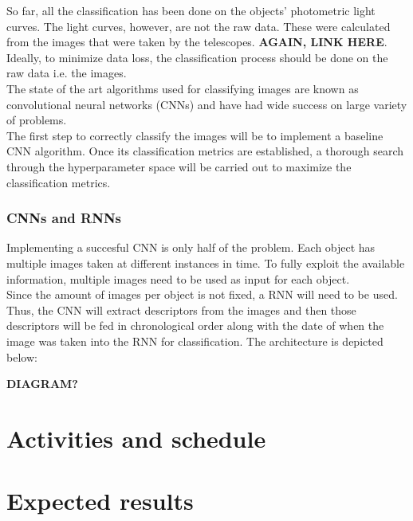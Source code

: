 So far, all the classification has been done on the objects' photometric light curves. The light curves, however, are not the raw data. These were calculated from the images that were taken by the telescopes. \textbf{AGAIN, LINK HERE}. Ideally, to minimize data loss, the classification process should be done on the raw data i.e. the images.\\ 

The state of the art algorithms used for classifying images are known as convolutional neural networks (CNNs) \cite{CNN} and have had wide success on large variety of problems.\\

The first step to correctly classify the images will be to implement a baseline CNN algorithm. Once its classification  metrics are established, a thorough search through the hyperparameter space will be carried out to maximize the classification metrics.

\subsubsection{CNNs and RNNs}

Implementing a succesful CNN is only half of the problem. Each object has multiple images taken at different instances in time. To fully exploit the available information, multiple images need to be used as input for each object.\\

Since the amount of images per object is not fixed, a RNN will need to be used. Thus, the CNN will extract descriptors from the images and then those descriptors will be fed in chronological order along with the date of when the image was taken into the RNN for classification. The architecture is depicted below:



\textbf{DIAGRAM?}

\section{Activities and schedule}
\section{Expected results}


\newpage
\printbibliography

